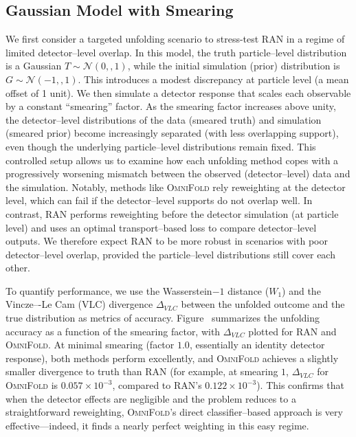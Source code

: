 {{    \subsection{Gaussian Model with Smearing}
        We first consider a targeted unfolding scenario to stress-test RAN in a regime of limited detector--level overlap.
        In this model, the truth particle--level distribution is a Gaussian $T \sim \mathcal{N}(0,,1)$, while the initial simulation (prior) distribution is $G \sim \mathcal{N}(-1,,1)$.
        This introduces a modest discrepancy at particle level (a mean offset of 1 unit).
        We then simulate a detector response that scales each observable by a constant “smearing” factor.
        As the smearing factor increases above unity, the detector--level distributions of the data (smeared truth) and simulation (smeared prior) become increasingly separated (with less overlapping support), even though the underlying particle--level distributions remain fixed.
        This controlled setup allows us to examine how each unfolding method copes with a progressively worsening mismatch between the observed (detector--level) data and the simulation.
        Notably, methods like \textsc{OmniFold} rely reweighting at the detector level, which can fail if the detector--level supports do not overlap well.
        In contrast, RAN performs reweighting before the detector simulation (at particle level) and uses an optimal transport--based loss to compare detector--level outputs.
        We therefore expect RAN to be more robust in scenarios with poor detector--level overlap, provided the particle--level distributions still cover each other.

        To quantify performance, we use the Wasserstein\(-1\) distance ($W_1$) and the Vincze–-Le Cam (VLC) divergence $\Delta_{VLC}$ between the unfolded outcome and the true distribution as metrics of accuracy.
        Figure~ summarizes the unfolding accuracy as a function of the smearing factor, with $\Delta_{VLC}$ plotted for RAN and \textsc{OmniFold}.
        At minimal smearing (factor $1.0$, essentially an identity detector response), both methods perform excellently, and \textsc{OmniFold} achieves a slightly smaller divergence to truth than RAN (for example, at smearing $1$, $\Delta_{VLC}$ for \textsc{OmniFold} is $0.057\times10^{-3}$, compared to RAN’s $0.122\times10^{-3}$).
        This confirms that when the detector effects are negligible and the problem reduces to a straightforward reweighting, \textsc{OmniFold}’s direct classifier--based approach is very effective---indeed, it finds a nearly perfect weighting in this easy regime.

}}
